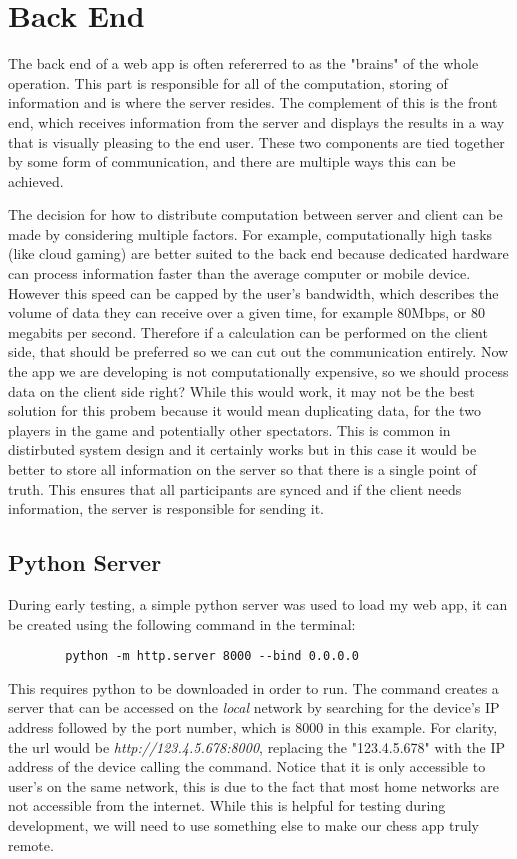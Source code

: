 \section{Back End}

The back end of a web app is often refererred to as the "brains" of the whole operation. This part is responsible for all of the computation, storing of information and is where the server resides. The complement of this is the front end, which receives information from the server and displays the results in a way that is visually pleasing to the end user. These two components are tied together by some form of communication, and there are multiple ways this can be achieved.

The decision for how to distribute computation between server and client can be made by considering multiple factors. For example, computationally high tasks (like cloud gaming) are better suited to the back end because dedicated hardware can process information faster than the average computer or mobile device. However this speed can be capped by the user's bandwidth, which describes the volume of data they can receive over a given time, for example 80Mbps, or 80 megabits per second. Therefore if a calculation can be performed on the client side, that should be preferred so we can cut out the communication entirely. Now the app we are developing is not computationally expensive, so we should process data on the client side right? While this would work, it may not be the best solution for this probem because it would mean duplicating data, for the two players in the game and potentially other spectators. This is common in distirbuted system design and it certainly works but in this case it would be better to store all information on the server so that there is a single point of truth. This ensures that all participants are synced and if the client needs information, the server is responsible for sending it.

\subsection{Python Server}

During early testing, a simple python server was used to load my web app, it can be created using the following command in the terminal:
\begin{center}
    \begin{lstlisting}
        python -m http.server 8000 --bind 0.0.0.0
    \end{lstlisting}
\end{center}
This requires python to be downloaded in order to run. The command creates a server that can be accessed on the \emph{local} network by searching for the device's IP address followed by the port number, which is 8000 in this example. For clarity, the url would be \emph{http://123.4.5.678:8000}, replacing the "123.4.5.678" with the IP address of the device calling the command. Notice that it is only accessible to user's on the same network, this is due to the fact that most home networks are not accessible from the internet. While this is helpful for testing during development, we will need to use something else to make our chess app truly remote.

